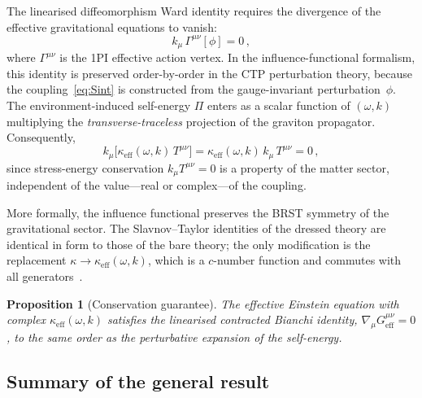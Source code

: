 \documentclass[12pt,a4paper]{article}
\newtheorem{proposition}[theorem]{Proposition}
\begin{document}
The linearised diffeomorphism Ward identity requires the divergence of
the effective gravitational equations to vanish:
\begin{equation}\label{eq:ward-div}
  k_{\mu}\,\Gamma^{\mu\nu}[\phi]=0\,,
\end{equation}
where $\Gamma^{\mu\nu}$ is the 1PI effective action vertex.  In the
influence-functional formalism, this identity is preserved
order-by-order in the CTP perturbation theory, because the
coupling~\eqref{eq:Sint} is constructed from the gauge-invariant
perturbation~$\phi$.  The environment-induced self-energy $\Pi$ enters
as a scalar function of $(\omega,k)$ multiplying the
\emph{transverse-traceless} projection of the graviton propagator.
Consequently,
\begin{equation}\label{eq:ward-preserved}
  k_{\mu}\bigl[\kappa_{\mathrm{eff}}(\omega,k)\,T^{\mu\nu}\bigr]
  = \kappa_{\mathrm{eff}}(\omega,k)\,k_{\mu}\,T^{\mu\nu}
  = 0\,,
\end{equation}
since stress-energy conservation $k_{\mu}T^{\mu\nu}=0$ is a
property of the matter sector, independent of the value---real or
complex---of the coupling.

More formally, the influence functional preserves the BRST symmetry of
the gravitational sector.  The Slavnov--Taylor identities of the
dressed theory are identical in form to those of the bare theory; the
only modification is the replacement
$\kappa\to\kappa_{\mathrm{eff}}(\omega,k)$, which is a
$c$-number function and commutes with all
generators~\cite{CalzettaHu2008}.

\begin{proposition}[Conservation guarantee]\label{prop:conservation}
The effective Einstein equation with complex
$\kappa_{\mathrm{eff}}(\omega,k)$ satisfies the linearised contracted
Bianchi identity, $\nabla_{\mu}G^{\mu\nu}_{\mathrm{eff}}=0$, to the
same order as the perturbative expansion of the self-energy.
\end{proposition}

\subsection{Summary of the general result}\label{ssec:sec2-summary}
\end{document}
